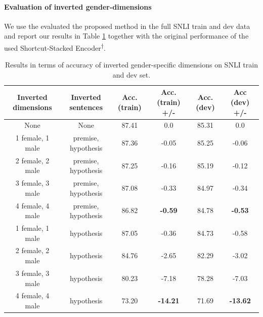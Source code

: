\paragraph*{Evaluation of inverted gender-dimensions}
We use the evaluated the proposed method in the full \ac{SNLI} train and dev data and report our results in Table \ref{tab:inverted_mf_results_acc} together with the original performance of the used Shortcut-Stacked Encoder\textsuperscript{$\dagger$}. 
\begin{table}[tph!]
\centering
\label{tab:inverted_mf_results_acc}
\begin{tabular}{cccccc}
\textbf{Inverted dimensions} & \textbf{Inverted sentences}  & \textbf{Acc. (train)} & \textbf{Acc. (train) +/-} & \textbf{Acc. (dev)} & \textbf{Acc (dev) +/-} \\
\toprule
None                   & None                   & 87.41        & 0.0              & 85.31      & 0.0           \\
\midrule
1 female, 1 male    & premise, hypothesis & 87.36        & -0.05            & 85.25      & -0.06         \\
2 female, 2 male    & premise, hypothesis & 87.25        & -0.16            & 85.19      & -0.12         \\
3 female, 3 male    & premise, hypothesis & 87.08        & -0.33            & 84.97      & -0.34         \\
4 female, 4 male    & premise, hypothesis & 86.82        & \textbf{-0.59}            & 84.78      & \textbf{-0.53}         \\
\midrule
1 female, 1 male    & hypothesis          & 87.05        & -0.36            & 84.73      & -0.58         \\
2 female, 2 male    & hypothesis          & 84.76        & -2.65            & 82.29      & -3.02         \\
3 female, 3 male    & hypothesis          & 80.23        & -7.18            & 78.28      & -7.03         \\
4 female, 4 male    & hypothesis           & 73.20        & \textbf{-14.21}           & 71.69      & \textbf{-13.62}    \\
\bottomrule    
\end{tabular}
\caption{Results in terms of accuracy of inverted gender-specific dimensions on \ac{SNLI} train and dev set.}
\end{table}
